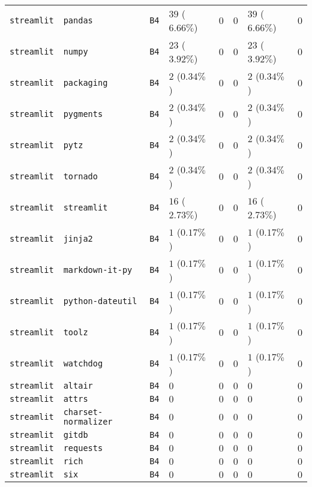 \begin{table}
\begin{tabular}{llllllll}
\texttt{streamlit} & \texttt{pandas} & \texttt{B4} & $39$ ($6.66\%$) & $0$ & $0$ & $39$ ($6.66\%$) & $0$ \\
\texttt{streamlit} & \texttt{numpy} & \texttt{B4} & $23$ ($3.92\%$) & $0$ & $0$ & $23$ ($3.92\%$) & $0$ \\
\texttt{streamlit} & \texttt{packaging} & \texttt{B4} & $2$ ($0.34\%$) & $0$ & $0$ & $2$ ($0.34\%$) & $0$ \\
\texttt{streamlit} & \texttt{pygments} & \texttt{B4} & $2$ ($0.34\%$) & $0$ & $0$ & $2$ ($0.34\%$) & $0$ \\
\texttt{streamlit} & \texttt{pytz} & \texttt{B4} & $2$ ($0.34\%$) & $0$ & $0$ & $2$ ($0.34\%$) & $0$ \\
\texttt{streamlit} & \texttt{tornado} & \texttt{B4} & $2$ ($0.34\%$) & $0$ & $0$ & $2$ ($0.34\%$) & $0$ \\
\texttt{streamlit} & \texttt{streamlit} & \texttt{B4} & $16$ ($2.73\%$) & $0$ & $0$ & $16$ ($2.73\%$) & $0$ \\
\texttt{streamlit} & \texttt{jinja2} & \texttt{B4} & $1$ ($0.17\%$) & $0$ & $0$ & $1$ ($0.17\%$) & $0$ \\
\texttt{streamlit} & \texttt{markdown-it-py} & \texttt{B4} & $1$ ($0.17\%$) & $0$ & $0$ & $1$ ($0.17\%$) & $0$ \\
\texttt{streamlit} & \texttt{python-dateutil} & \texttt{B4} & $1$ ($0.17\%$) & $0$ & $0$ & $1$ ($0.17\%$) & $0$ \\
\texttt{streamlit} & \texttt{toolz} & \texttt{B4} & $1$ ($0.17\%$) & $0$ & $0$ & $1$ ($0.17\%$) & $0$ \\
\texttt{streamlit} & \texttt{watchdog} & \texttt{B4} & $1$ ($0.17\%$) & $0$ & $0$ & $1$ ($0.17\%$) & $0$ \\
\texttt{streamlit} & \texttt{altair} & \texttt{B4} & $0$ & $0$ & $0$ & $0$ & $0$ \\
\texttt{streamlit} & \texttt{attrs} & \texttt{B4} & $0$ & $0$ & $0$ & $0$ & $0$ \\
\texttt{streamlit} & \texttt{charset-normalizer} & \texttt{B4} & $0$ & $0$ & $0$ & $0$ & $0$ \\
\texttt{streamlit} & \texttt{gitdb} & \texttt{B4} & $0$ & $0$ & $0$ & $0$ & $0$ \\
\texttt{streamlit} & \texttt{requests} & \texttt{B4} & $0$ & $0$ & $0$ & $0$ & $0$ \\
\texttt{streamlit} & \texttt{rich} & \texttt{B4} & $0$ & $0$ & $0$ & $0$ & $0$ \\
\texttt{streamlit} & \texttt{six} & \texttt{B4} & $0$ & $0$ & $0$ & $0$ & $0$ \\

\end{tabular}
\end{table}
